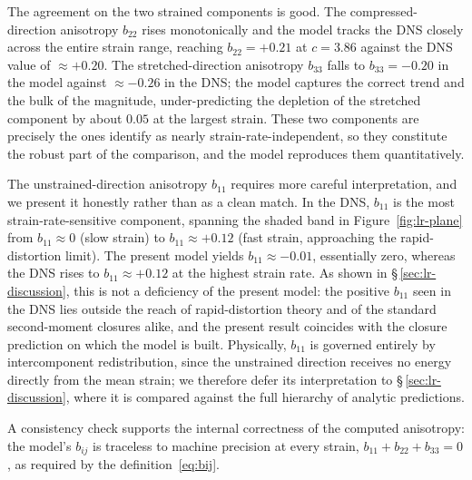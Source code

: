 \documentclass[lineno]{JFM-FLM_Au}
\begin{document}
The agreement on the two strained components is good. The compressed-direction
anisotropy $b_{22}$ rises monotonically and the model tracks the DNS closely
across the entire strain range, reaching $b_{22}=+0.21$ at $c=3.86$ against the
DNS value of $\approx+0.20$. The stretched-direction anisotropy $b_{33}$ falls to
$b_{33}=-0.20$ in the model against $\approx-0.26$ in the DNS; the model captures
the correct trend and the bulk of the magnitude, under-predicting the depletion of
the stretched component by about $0.05$ at the largest strain. These two
components are precisely the ones \citeauthor{LeeReynolds1985} identify as
nearly strain-rate-independent, so they constitute the robust part of the
comparison, and the model reproduces them quantitatively.

The unstrained-direction anisotropy $b_{11}$ requires more careful
interpretation, and we present it honestly rather than as a clean match. In the
DNS, $b_{11}$ is the most strain-rate-sensitive component, spanning the shaded
band in Figure~\ref{fig:lr-plane} from $b_{11}\approx0$ (slow strain) to
$b_{11}\approx+0.12$ (fast strain, approaching the rapid-distortion limit). The
present model yields $b_{11}\approx-0.01$, essentially zero, whereas the DNS
rises to $b_{11}\approx+0.12$ at the highest strain rate. As shown in
\S\,\ref{sec:lr-discussion}, this is not a deficiency of the present model: the
positive $b_{11}$ seen in the DNS lies outside the reach of rapid-distortion
theory and of the standard second-moment closures alike, and the present result
coincides with the closure prediction on which the model is built. Physically,
$b_{11}$ is governed entirely by intercomponent redistribution, since the
unstrained direction receives no energy directly from the mean strain; we
therefore defer its interpretation to \S\,\ref{sec:lr-discussion}, where it is
compared against the full hierarchy of analytic predictions.

A consistency check supports the internal correctness of the computed
anisotropy: the model's $b_{ij}$ is traceless to machine precision at every
strain, $b_{11}+b_{22}+b_{33}=0$, as required by the definition~\eqref{eq:bij}.
\end{document}
